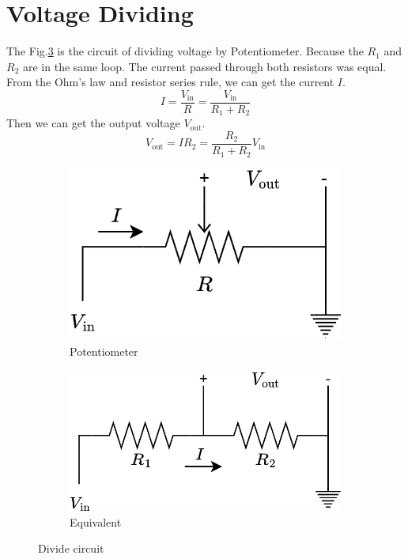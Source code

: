\documentclass[a4paper, 12pt, AutoFakeBold]{report}
\newcommand{\figref}[1]{Fig.\ref{#1}}
\begin{document}
    \section{Voltage Dividing}
    \label{ch:Voltage_div}
    The \figref{fig:Divide_circuit} is the circuit of dividing voltage by Potentiometer. Because the $R_1$ and $R_2$ are in the same loop. The current passed through both resistors was equal. From the Ohm's law and resistor series rule, we can get the current $I$.
    \begin{equation}
        I = \frac{V_\text{in}}{R} = \frac{V_\text{in}}{R_1+R_2}
    \end{equation}
    Then we can get the output voltage $V_\text{out}$.
    \begin{equation}
        V_\text{out} = IR_2 = \frac{R_2}{R_1+R_2}V_\text{in}
    \end{equation}
    \begin{figure}[H]
        \begin{subfigure}{.5\textwidth}
            \centering
            \includegraphics[scale=.5]{figs/Circuit_divide.png}
            \caption{Potentiometer}
            \label{fig:Divide_circuit_potentiometer}
        \end{subfigure}
        \begin{subfigure}{.5\textwidth}
            \centering
            \includegraphics[scale=.5]{figs/Circuit_divide_eq.png}
            \caption{Equivalent}
            \label{fig:Divide_circuit_eq}
        \end{subfigure}
        \caption{Divide circuit}
        \label{fig:Divide_circuit}
    \end{figure}
\end{document}
